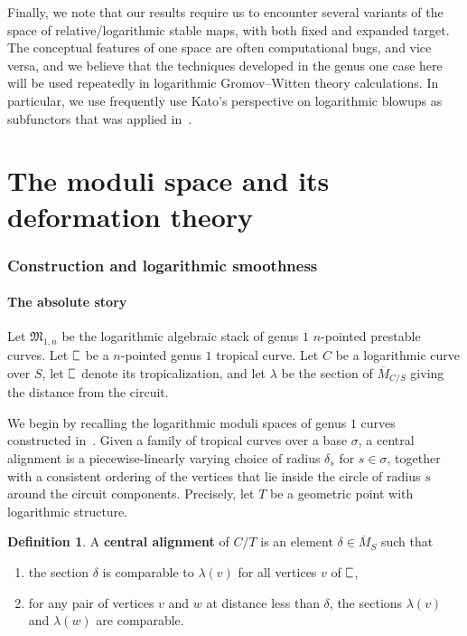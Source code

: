\documentclass[11pt]{amsart}
\newcommand{\plC}{\scalebox{0.8}[1.3]{$\sqsubset$}}
\theoremstyle{definition}
\theoremstyle{definition}
\newtheorem{definition}[thm]{Definition}
\begin{document}
Finally, we note that our results require us to encounter several variants of the space of relative/logarithmic stable maps, with both fixed and expanded target. The conceptual features of one space are often computational bugs, and vice versa, and we believe that the techniques developed in the genus one case here will be used repeatedly in logarithmic Gromov--Witten theory calculations. In particular, we use frequently use Kato's perspective on logarithmic blowups as subfunctors that was applied in~\cite{RSPW,RSPW2}. 

\part{The moduli space and its deformation theory}

\section{Construction and logarithmic smoothness}

\subsection{The absolute story} Let $\mathfrak M_{1,n}$ be the logarithmic algebraic stack of genus $1$ $n$-pointed prestable curves. Let $\plC$ be a $n$-pointed genus $1$ tropical curve. Let $C$ be a logarithmic curve over $S$, let $\plC$ denote its tropicalization, and let $\lambda$ be the section of $\overline{M}_{C/S}$ giving the distance from the circuit. 

We begin by recalling the logarithmic moduli spaces of genus $1$ curves constructed in~\cite[Sections 2 \& 4]{RSPW}. Given a family of tropical curves over a base $\sigma$, a central alignment is a piecewise-linearly varying choice of radius $\delta_s$ for $s\in\sigma$, together with a consistent ordering of the vertices that lie inside the circle of radius $s$ around the circuit components. Precisely, let $T$ be a geometric point with logarithmic structure.

\begin{definition}
A \textbf{central alignment} of $C/T$ is an element $\delta\in\overline{M}_S$ such that
\begin{enumerate}
    \item the section $\delta$ is comparable to $\lambda(v)$ for all vertices $v$ of $\plC$,
    \item for any pair of vertices $v$ and $w$ at distance less than $\delta$, the sections $\lambda(v)$ and $\lambda(w)$ are comparable.
\end{enumerate}
\end{definition}
\end{document}
